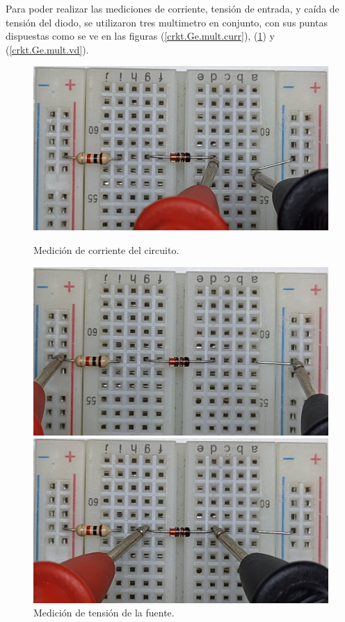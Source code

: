 \documentclass[chaptersright]{informeutn}
\begin{document}
      Para poder realizar las mediciones de corriente, tensión de entrada, y caída de tensión del diodo, se utilizaron
      tres multimetro en conjunto, con sus puntas dispuestas como se ve en las figuras (\ref{crkt.Ge.mult.curr}),
      (\ref{crkt.Ge.mult.vi}) y (\ref{crkt.Ge.mult.vd}).
      \begin{figure}[H]
        \centering
        \begin{minipage}{0.3\textwidth}
          \includegraphics[angle=180, width=1\textwidth]{pictures/prot_crkt-2_curr.jpg}
          \caption{Medición de corriente del circuito.}
          \label{crkt.Ge.mult.curr}
        \end{minipage}
        \begin{minipage}{0.3\textwidth}
          \includegraphics[angle=180, width=1\textwidth]{pictures/prot_crkt-2_vi.jpg}
          \caption{Medición de tensión de la fuente.}
          \label{crkt.Ge.mult.vi}
        \end{minipage}
        \begin{minipage}{0.3\textwidth}
          \includegraphics[angle=180, width=1\textwidth]{pictures/prot_crkt-2_vd.jpg}

\end{minipage}
\end{figure}
\end{document}
